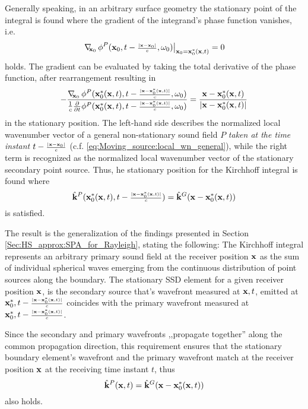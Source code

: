 Generally speaking, in an arbitrary surface geometry the stationary point of the integral is found where the gradient of the integrand's phase function vanishes, i.e.
\begin{equation}
\left. \nabla_{\!\!\mathbf{x}_0}\, \phi^P(\mathbf{x}_0,t-{\scriptstyle \frac{|\mathbf{x}-\mathbf{x}_0|}{c} },\omega_0) \right|_{\mathbf{x}_0 = \mathbf{x}_0^*(\mathbf{x},t)} = 0
\end{equation} 
holds.
The gradient can be evaluated by taking the total derivative of the phase function, after rearrangement resulting in
\begin{equation}
-\frac{\nabla_{\!\!\mathbf{x}_0}\, \phi^P(\mathbf{x}_0^*(\mathbf{x},t),t-{\scriptstyle \frac{|\mathbf{x}-\mathbf{x}_0^*(\mathbf{x},t)|}{c} },\omega_0) }{\frac{1}{c}\frac{\partial }{\partial t}\phi^P(\mathbf{x}_0^*(\mathbf{x},t),t-{\scriptstyle \frac{|\mathbf{x}-\mathbf{x}_0^*(\mathbf{x},t)|}{c} },\omega_0) } = \frac{\mathbf{x}-\mathbf{x}_0^*(\mathbf{x},t)}{|\mathbf{x}-\mathbf{x}_0^*(\mathbf{x},t)|}
\end{equation}
in the stationary position.
The left-hand side describes the normalized local wavenumber vector of a general non-stationary sound field $P$ \emph{taken at the time instant $t-{\scriptstyle \frac{|\mathbf{x}-\mathbf{x}_0|}{c} }$} (c.f. \eqref{eq:Moving_source:local_wn_general}), while the right term is recognized as the normalized local wavenumber vector of the stationary secondary point source. 
Thus, he stationary position for the Kirchhoff integral is found where
\begin{equation}
\label{Eq:moving_sources:moving_point_stat_point_1}
\hat{\mathbf{k}}^P(\mathbf{x}_0^*(\mathbf{x},t),t-{\scriptstyle \frac{|\mathbf{x}-\mathbf{x}_0^*(\mathbf{x},t)|}{c} }) = \hat{\mathbf{k}}^G(\mathbf{x}-\mathbf{x}_0^*(\mathbf{x},t))
\end{equation}
is satisfied.

The result is the generalization of the findings presented in Section \ref{Sec:HS_approx:SPA_for_Rayleigh}, stating the following:
The Kirchhoff integral represents an arbitrary primary sound field at the receiver position $\mathbf{x}$ as the sum of individual spherical waves emerging from the continuous distribution of point sources along the boundary.
The stationary SSD element for a given receiver position $\mathbf{x}$, is the secondary source that's wavefront measured at $\mathbf{x},t$, emitted at $\mathbf{x}_0^*, t-{\scriptstyle \frac{|\mathbf{x}-\mathbf{x}_0^*(\mathbf{x},t)|}{c} }$ coincides with the primary wavefront measured at $\mathbf{x}_0^*, t-{\scriptstyle \frac{|\mathbf{x}-\mathbf{x}_0^*(\mathbf{x},t)|}{c} }$.

Since the secondary and primary wavefronts ,,propagate together'' along the common propagation direction, 	this requirement ensures that the stationary boundary element's wavefront and the primary wavefront match at the receiver position $\mathbf{x}$ at the receiving time instant $t$, thus 
\begin{equation}
\hat{\mathbf{k}}^P(\mathbf{x},t) = \hat{\mathbf{k}}^G(\mathbf{x}-\mathbf{x}_0^*(\mathbf{x},t))
\end{equation}
also holds.

